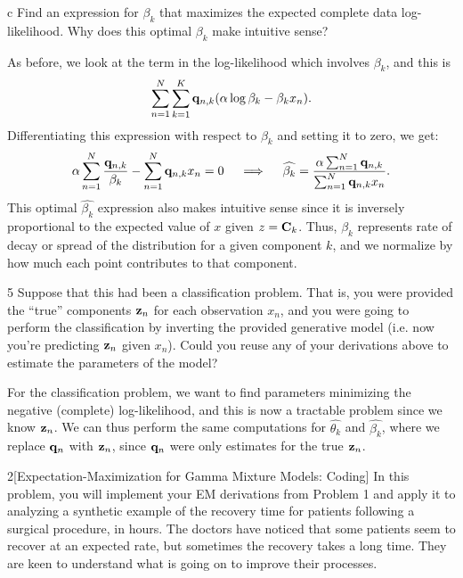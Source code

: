 \documentclass[expanded]{lkx_pset}
\begin{document}
\begin{solution}
\begin{parts}
		\begin{part}{c}
			Find an expression for $\beta_k$ that maximizes the expected complete data log-likelihood.  Why does this optimal $\beta_k$  make intuitive sense?
		\end{part}

		As before, we look at the term in the log-likelihood which involves $\beta_k$, and this is
		\[
			\sum_{n=1}^N \sum^K_{k=1} \mathbf{q}_{n,k} (\alpha\log\beta_k - \beta_k x_n).
		\]
		Differentiating this expression with respect to $\beta_k$ and setting it to zero, we get:
		\[
			\alpha\sum^N_{n=1} \frac{\mathbf{q}_{n,k}}{\beta_k} - \sum^N_{n=1} \mathbf{q}_{n,k} x_n=0\quad\implies \quad \widehat{\beta_k} = \frac{\alpha \sum^N_{n=1}\mathbf{q}_{n,k}}{\sum^N_{n=1}\mathbf{q}_{n,k} x_n}.
		\]
		This optimal $\widehat{\beta_k}$ expression also makes intuitive sense since it is inversely proportional to the expected value of $x$ given $z = \mathbf{C}_k$. Thus, $\beta_k$ represents rate of decay or spread of the distribution for a given component $k$, and we normalize by how much each point contributes to that component.
	\end{parts}

	\begin{part}{5}
		Suppose that this had been a classification problem. That is,
		you were provided the ``true'' components $\mathbf{z}_n$ for each
		observation $x_n$,
		and you were going to perform the classification by
		inverting the provided generative model (i.e. now you're predicting $\mathbf{z}_n$ given $x_n$). Could you reuse any of
		your derivations above to estimate the parameters of the model?
	\end{part}

	For the classification problem, we want to find parameters minimizing the negative (complete) log-likelihood, and this is now a tractable problem since we know $\mathbf{z}_n$. We can thus perform the same computations for $\widehat{\theta_k}$ and $\widehat{\beta_k}$, where we replace $\mathbf{q}_{n}$ with $\mathbf{z}_n$, since $\mathbf{q}_n$ were only estimates for the true $\mathbf{z}_n$.
\end{solution}

\begin{problem}{2}[Expectation-Maximization for Gamma Mixture Models: Coding]
In this problem, you will implement your EM derivations from Problem
1 and apply it to analyzing a synthetic example of the recovery time
for patients following a surgical procedure, in hours.  The doctors
have noticed that some patients seem to recover at an expected rate,
but sometimes the recovery takes a long time.  They are keen to
understand what is going on to improve their processes.
\end{problem}
\end{document}
